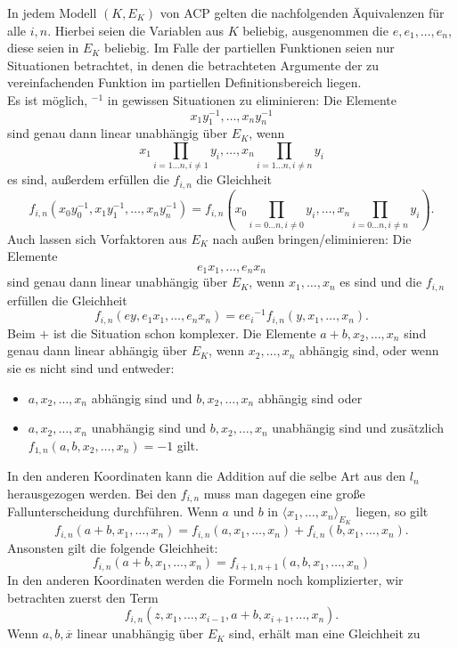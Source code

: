     \begin{fact}\label{Eliminierungsregeln}
    	In jedem Modell $(K,E_K)$ von ACP gelten die nachfolgenden Äquivalenzen für alle $i,n$. Hierbei seien die Variablen aus $K$ beliebig, ausgenommen die $e,e_1,\dots,e_n$, diese seien in $E_K$ beliebig. Im Falle der partiellen Funktionen seien nur Situationen betrachtet, in denen die betrachteten Argumente der zu vereinfachenden Funktion im partiellen Definitionsbereich liegen.\\
    	Es ist möglich, \glqq{}$^{-1}$\grqq{} in gewissen Situationen zu eliminieren:
    	Die Elemente $$x_1y_1^{-1},\dots,x_ny_n^{-1}$$ sind genau dann linear unabhängig über $E_K$, wenn $$x_1\prod\limits_{i=1\dots n,i\neq 1}y_i,\dots,x_n\prod\limits_{i=1\dots n,i\neq n}y_i$$ es sind, außerdem erfüllen die $f_{i,n}$ die Gleichheit
    	$$f_{i,n}(x_0y_0^{-1},x_1y_1^{-1},\dots,x_ny_n^{-1})= f_{i,n}\left(x_0\prod\limits_{i=0\dots n,i\neq 0}y_i,\dots,x_n\prod\limits_{i=0\dots n,i\neq n}y_i\right).$$
    	Auch lassen sich Vorfaktoren aus $E_K$ nach außen bringen/eliminieren: Die Elemente $$e_1x_1,\dots,e_nx_n$$ sind genau dann linear unabhängig über $E_K$, wenn $x_1,\dots,x_n$ es sind und die $f_{i,n}$ erfüllen die Gleichheit
    	$$f_{i,n}(ey,e_1x_1,\dots,e_nx_n)=e{e_i}^{-1}f_{i,n}(y,x_1,\dots,x_n).$$\newpage
    	Beim \glqq{}$+$\grqq{} ist die Situation schon komplexer. Die Elemente $a+b,x_2,\dots,x_n$ sind genau dann linear abhängig über $E_K$, wenn $x_2,\dots,x_n$ abhängig sind, oder wenn sie es nicht sind und entweder:
    	\begin{itemize}
    		\item $a,x_2,\dots,x_n$ abhängig sind und $b,x_2,\dots,x_n$ abhängig sind oder
    		\item $a,x_2,\dots,x_n$ unabhängig sind und $b,x_2,\dots,x_n$ unabhängig sind und zusätzlich $f_{1,n}(a,b,x_2,\dots,x_n)=-1$ gilt.
    	\end{itemize}
        In den anderen Koordinaten kann die Addition auf die selbe Art aus den $l_n$ herausgezogen werden. Bei den $f_{i,n}$ muss man dagegen eine große Fallunterscheidung durchführen. Wenn $a$ und $b$ in $\langle x_1,\dots,x_n\rangle_{E_K}$ liegen, so gilt
    	$$f_{i,n}(a+b,x_1,\dots,x_n)=f_{i,n}(a,x_1,\dots,x_n)+f_{i,n}(b,x_1,\dots,x_n).$$
    	Ansonsten gilt die folgende Gleichheit:
    	$$f_{i,n}(a+b,x_1,\dots,x_n)=f_{i+1,n+1}(a,b,x_1,\dots,x_n)$$
    	In den anderen Koordinaten werden die Formeln noch komplizierter, wir betrachten zuerst den Term $$f_{i,n}(z,x_1,\dots,x_{i-1},a+b,x_{i+1},\dots,x_n).$$ Wenn $a,b,\overline{x}$ linear unabhängig über $E_K$ sind, erhält man eine Gleichheit zu

\end{fact}
